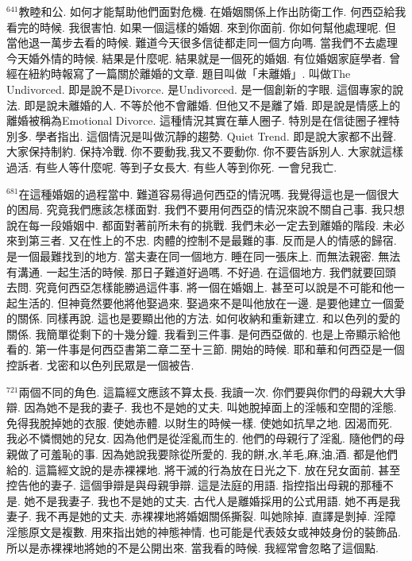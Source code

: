 \documentclass{book}
\begin{document}
$^{641}$教睦和公.
如何才能幫助他們面對危機.
在婚姻關係上作出防衛工作.
何西亞給我看完的時候.
我很害怕.
如果一個這樣的婚姻.
來到你面前.
你如何幫他處理呢.
但當他退一萬步去看的時候.
難道今天很多信徒都走同一個方向嗎.
當我們不去處理今天婚外情的時候.
結果是什麼呢.
結果就是一個死的婚姻.
有位婚姻家庭學者.
曾經在紐約時報寫了一篇關於離婚的文章.
題目叫做「未離婚」.
叫做The Undivorced.
即是說不是Divorce.
是Undivorced.
是一個創新的字眼.
這個專家的說法.
即是說未離婚的人.
不等於他不會離婚.
但他又不是離了婚.
即是說是情感上的離婚被稱為Emotional Divorce.
這種情況其實在華人圈子.
特別是在信徒圈子裡特別多.
學者指出.
這個情況是叫做沉靜的趨勢.
Quiet Trend.
即是說大家都不出聲.
大家保持制約.
保持冷戰.
你不要動我,我又不要動你.
你不要告訴別人.
大家就這樣過活.
有些人等什麼呢.
等到子女長大.
有些人等到你死.
一會兒我亡.

$^{681}$在這種婚姻的過程當中.
難道容易得過何西亞的情況嗎.
我覺得這也是一個很大的困局.
究竟我們應該怎樣面對.
我們不要用何西亞的情況來說不關自己事.
我只想說在每一段婚姻中.
都面對著前所未有的挑戰.
我們未必一定去到離婚的階段.
未必來到第三者.
又在性上的不忠.
肉體的控制不是最難的事.
反而是人的情感的歸宿.
是一個最難找到的地方.
當夫妻在同一個地方.
睡在同一張床上.
而無法親密.
無法有溝通.
一起生活的時候.
那日子難道好過嗎.
不好過.
在這個地方.
我們就要回頭去問.
究竟何西亞怎樣能勝過這件事.
將一個在婚姻上.
甚至可以說是不可能和他一起生活的.
但神竟然要他將他娶過來.
娶過來不是叫他放在一邊.
是要他建立一個愛的關係.
同樣再說.
這也是要顯出他的方法.
如何收納和重新建立.
和以色列的愛的關係.
我簡單從剩下的十幾分鐘.
我看到三件事.
是何西亞做的.
也是上帝顯示給他看的.
第一件事是何西亞書第二章二至十三節.
開始的時候.
耶和華和何西亞是一個控訴者.
戈密和以色列民眾是一個被告.

$^{721}$兩個不同的角色.
這篇經文應該不算太長.
我讀一次.
你們要與你們的母親大大爭辯.
因為她不是我的妻子.
我也不是她的丈夫.
叫她脫掉面上的淫帳和空間的淫態.
免得我脫掉她的衣服.
使她赤體.
以財生的時候一樣.
使她如抗旱之地.
因渴而死.
我必不憐憫她的兒女.
因為他們是從淫亂而生的.
他們的母親行了淫亂.
隨他們的母親做了可羞恥的事.
因為她說我要除從所愛的.
我的餅,水,羊毛,麻,油,酒.
都是他們給的.
這篇經文說的是赤裸裸地.
將干滅的行為放在日光之下.
放在兒女面前.
甚至控告他的妻子.
這個爭辯是與母親爭辯.
這是法庭的用語.
指控指出母親的那種不是.
她不是我妻子.
我也不是她的丈夫.
古代人是離婚採用的公式用語.
她不再是我妻子.
我不再是她的丈夫.
赤裸裸地將婚姻關係撕裂.
叫她除掉.
直譯是剝掉.
淫障淫態原文是複數.
用來指出她的神態神情.
也可能是代表妓女或神妓身份的裝飾品.
所以是赤裸裸地將她的不是公開出來.
當我看的時候.
我經常會忽略了這個點.
\end{document}
